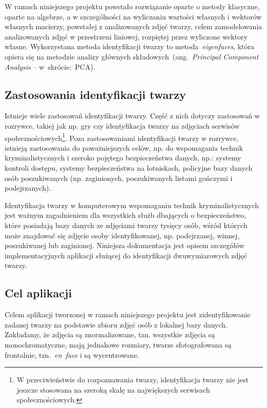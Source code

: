 \documentclass[a4paper,titlepage]{article}
\theoremstyle{break}
\numberwithin{equation}{subsection}
\begin{document}
W ramach niniejszego projektu powstało rozwiązanie oparte o metody klasyczne, oparte na algebrze, a w szczególności na wyliczaniu wartości własnych i wektorów własnych macierzy, powstałej z analizowanych zdjęć twarzy, celem zamodelowania analizowanych zdjęć w przestrzeni liniowej, rozpiętej przez wyliczone wektory własne. Wykorzystana metoda identyfikacji twarzy to metoda~\emph{eigenfaces}, która opiera się na metodzie analizy głównych składowych~(ang.~\emph{Principal Component Analysis} -- w~skrócie:~PCA).


\subsection{Zastosowania identyfikacji twarzy}

Istnieje wiele zastosowań identyfikacji twarzy. Część z nich dotyczy zastosowań w rozrywce, takiej jak np. gry czy identyfikacja twarzy na zdjęciach serwisów społecznościowych\footnote{W przeciwieństwie do rozpoznawania twarzy, identyfikacja twarzy nie jest jeszcze stosowana na szeroką skalę na największych serwisach społecznościowych.}. Poza zastosowaniami identyfikacji twarzy w rozrywce, istnieją zastosowania do poważniejszych celów, np. do wspomagania technik kryminalistycznych i szeroko pojętego bezpieczeństwa danych, np.: systemy kontroli dostępu, systemy bezpieczeństwa na lotniskach, policyjne bazy danych osób poszukiwanych (np. zaginionych, poszukiwanych listami gończymi i podejrzanych).

Identyfikacja twarzy w komputerowym wspomaganiu technik kryminalistycznych jest ważnym zagadnieniem dla wszystkich służb dbających o bezpieczeństwo, które posiadają bazy danych ze zdjęciami twarzy tysięcy osób, wśród których może znajdować się zdjęcie osoby identyfikowanej, np. podejrzanej, winnej, poszukiwanej lub zaginionej. Niniejsza dokumentacja jest opisem szczegółów implementacyjnych aplikacji służącej do identyfikacji dwuwymiarowych zdjęć twarzy.


\subsection{Cel aplikacji}

Celem aplikacji tworzonej w ramach niniejszego projektu jest zidentyfikowanie zadanej twarzy na podstawie zbioru zdjęć osób z lokalnej bazy danych. Zakładamy, że zdjęcia są znormalizowane, tzn. wszystkie zdjęcia są monochromatyczne, mają jednakowe rozmiary, twarze sfotografowana są frontalnie, tzn.~\emph{en~face} i są wycentrowane.
\end{document}
